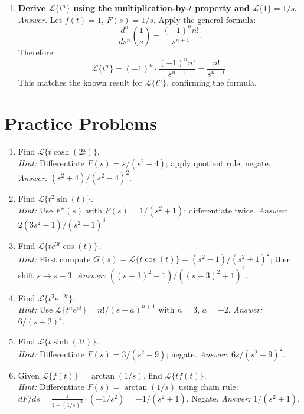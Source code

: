 \documentclass[12pt,a4paper]{article}
\begin{document}
\begin{enumerate}
Step 2: shift $s\to s+1$ (First Shifting Theorem with $a=-1$):
\[
  \mathcal{L}\{te^{-t}\cos(2t)\}=G(s+1)=\frac{(s+1)^2-4}{((s+1)^2+4)^2}
  =\frac{s^2+2s-3}{(s^2+2s+5)^2}.
\]

\item \textbf{Derive $\mathcal{L}\{t^n\}$ using the multiplication-by-$t$ property
and $\mathcal{L}\{1\}=1/s$.}\\
\textit{Answer.} Let $f(t)=1$, $F(s)=1/s$. Apply the general formula:
\[
  \frac{d^n}{ds^n}\left(\frac{1}{s}\right)
  = \frac{(-1)^n n!}{s^{n+1}}.
\]
Therefore
\[
  \mathcal{L}\{t^n\}=(-1)^n\cdot\frac{(-1)^n n!}{s^{n+1}}=\frac{n!}{s^{n+1}}.
\]
This matches the known result for $\mathcal{L}\{t^n\}$, confirming the formula.

\end{enumerate}

\section{Practice Problems}
\begin{enumerate}

\item Find $\mathcal{L}\{t\cosh(2t)\}$.\\
\textit{Hint:} Differentiate $F(s)=s/(s^2-4)$; apply quotient rule;
negate. \textit{Answer:} $(s^2+4)/(s^2-4)^2$.

\item Find $\mathcal{L}\{t^2\sin(t)\}$.\\
\textit{Hint:} Use $F''(s)$ with $F(s)=1/(s^2+1)$; differentiate twice.
\textit{Answer:} $2(3s^2-1)/(s^2+1)^3$.

\item Find $\mathcal{L}\{te^{3t}\cos(t)\}$.\\
\textit{Hint:} First compute $G(s)=\mathcal{L}\{t\cos(t)\}=(s^2-1)/(s^2+1)^2$;
then shift $s\to s-3$.
\textit{Answer:} $((s-3)^2-1)/((s-3)^2+1)^2$.

\item Find $\mathcal{L}\{t^3 e^{-2t}\}$.\\
\textit{Hint:} Use $\mathcal{L}\{t^n e^{at}\}=n!/(s-a)^{n+1}$ with $n=3$, $a=-2$.
\textit{Answer:} $6/(s+2)^4$.

\item Find $\mathcal{L}\{t\sinh(3t)\}$.\\
\textit{Hint:} Differentiate $F(s)=3/(s^2-9)$; negate.
\textit{Answer:} $6s/(s^2-9)^2$.

\item Given $\mathcal{L}\{f(t)\}=\arctan(1/s)$, find $\mathcal{L}\{tf(t)\}$.\\
\textit{Hint:} Differentiate $F(s)=\arctan(1/s)$ using chain rule:
$dF/ds = \frac{1}{1+(1/s)^2}\cdot(-1/s^2) = -1/(s^2+1)$. Negate.
\textit{Answer:} $1/(s^2+1)$.

\end{enumerate}
\end{document}
